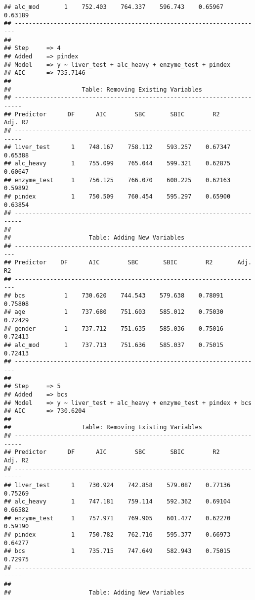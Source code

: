 \documentclass[
]{article}
\begin{document}
\begin{verbatim}
## alc_mod       1    752.403    764.337    596.743    0.65967    0.63189 
## ----------------------------------------------------------------------
## 
## Step     => 4 
## Added    => pindex 
## Model    => y ~ liver_test + alc_heavy + enzyme_test + pindex 
## AIC      => 735.7146 
## 
##                    Table: Removing Existing Variables                    
## ------------------------------------------------------------------------
## Predictor      DF      AIC        SBC       SBIC        R2       Adj. R2 
## ------------------------------------------------------------------------
## liver_test      1    748.167    758.112    593.257    0.67347    0.65388 
## alc_heavy       1    755.099    765.044    599.321    0.62875    0.60647 
## enzyme_test     1    756.125    766.070    600.225    0.62163    0.59892 
## pindex          1    750.509    760.454    595.297    0.65900    0.63854 
## ------------------------------------------------------------------------
## 
##                      Table: Adding New Variables                       
## ----------------------------------------------------------------------
## Predictor    DF      AIC        SBC       SBIC        R2       Adj. R2 
## ----------------------------------------------------------------------
## bcs           1    730.620    744.543    579.638    0.78091    0.75808 
## age           1    737.680    751.603    585.012    0.75030    0.72429 
## gender        1    737.712    751.635    585.036    0.75016    0.72413 
## alc_mod       1    737.713    751.636    585.037    0.75015    0.72413 
## ----------------------------------------------------------------------
## 
## Step     => 5 
## Added    => bcs 
## Model    => y ~ liver_test + alc_heavy + enzyme_test + pindex + bcs 
## AIC      => 730.6204 
## 
##                    Table: Removing Existing Variables                    
## ------------------------------------------------------------------------
## Predictor      DF      AIC        SBC       SBIC        R2       Adj. R2 
## ------------------------------------------------------------------------
## liver_test      1    730.924    742.858    579.087    0.77136    0.75269 
## alc_heavy       1    747.181    759.114    592.362    0.69104    0.66582 
## enzyme_test     1    757.971    769.905    601.477    0.62270    0.59190 
## pindex          1    750.782    762.716    595.377    0.66973    0.64277 
## bcs             1    735.715    747.649    582.943    0.75015    0.72975 
## ------------------------------------------------------------------------
## 
##                      Table: Adding New Variables                       

\end{verbatim}
\end{document}
